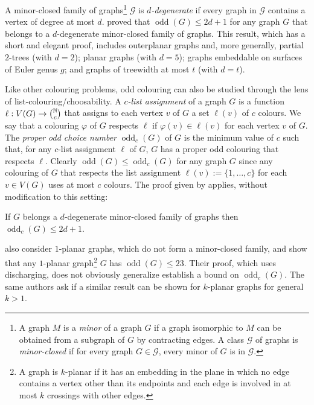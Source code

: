 \documentclass{patmorin}
\DeclareMathOperator{\odd}{odd}
\newcommand{\oddc}{\odd_c}
\begin{document}
A minor-closed family of graphs\footnote{A graph $M$ is a \textit{minor} of a graph $G$ if a graph isomorphic to $M$ can be obtained from a subgraph of $G$ by contracting edges. A class $\mathcal{G}$ of graphs is \emph{minor-closed} if for every graph $G\in\mathcal{G}$, every minor of $G$ is in $\mathcal{G}$.} $\mathcal{G}$ is \emph{$d$-degenerate} if every graph in $\mathcal{G}$ contains a vertex of degree at most $d$.
\citet{cranston.lafferty.ea:note} proved that $\odd(G)\le 2d+1$ for any graph $G$ that belongs to a $d$-degenerate minor-closed family of graphs.  This result, which has a short and elegant proof, includes outerplanar graphs and, more generally, partial $2$-trees (with $d=2$); planar graphs (with $d=5$); graphs embeddable on surfaces of Euler genus $g$; and graphs of treewidth at most $t$ (with $d=t$).  

Like other colouring problems, odd colouring can also be studied through the lens of list-colouring/choosability.  A \emph{$c$-list assignment} of a graph $G$ is a function $\ell:V(G)\to\binom{\mathbb{N}}{c}$ that assigns to each vertex $v$ of $G$ a set $\ell(v)$ of $c$ colours.  We say that a colouring $\varphi$ of $G$ respects $\ell$ if $\varphi(v)\in \ell(v)$ for each vertex $v$ of $G$.  The \emph{proper odd choice number} $\oddc(G)$ of $G$ is the minimum value of $c$ such that, for any $c$-list assignment $\ell$ of $G$, $G$ has a proper odd colouring that respects $\ell$. Clearly $\odd(G)\le \oddc(G)$ for any graph $G$ since any colouring of $G$ that respects the list assignment $\ell(v):=\{1,\ldots,c\}$ for each $v\in V(G)$ uses at most $c$ colours.  The proof given by \citet{cranston.lafferty.ea:note} applies, without modification to this setting:

\begin{thm}\label{degenerate}
  If $G$ belongs a $d$-degenerate minor-closed family of graphs then $\oddc(G)\le 2d+1$.  
\end{thm}

\citet{cranston.lafferty.ea:note} also consider $1$-planar graphs, which do not form a minor-closed family, and show that any $1$-planar graph\footnote{A graph is $k$-planar if it has an embedding in the plane in which no edge contains a vertex other than its endpoints and each edge is involved in at most $k$ crossings with other edges.} $G$ has $\odd(G)\le 23$. Their proof, which uses discharging, does not obviously generalize establish a bound on $\odd_c(G)$. The same authors ask if a similar result can be shown for $k$-planar graphs for general $k>1$.
\end{document}

